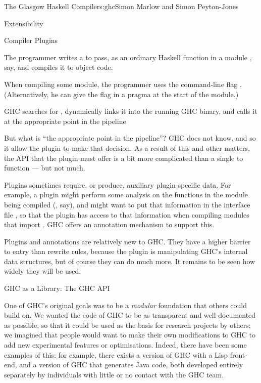 \begin{aosachapter}{The Glasgow Haskell Compiler}{s:ghc}{Simon Marlow and Simon Peyton-Jones}
\begin{aosasect1}{Extensibility}
\begin{aosasect2}{Compiler Plugins}
\begin{aosaitemize}

\item The programmer writes a  to  pass, as an
  ordinary Haskell function in a module , say, and compiles
  it to object code.

\item When compiling some module, the programmer uses the command-line
  flag .  (Alternatively, he can give the flag in a
  pragma at the start of the module.)

\item GHC searches for , dynamically links it into the
  running GHC binary, and calls it at the appropriate point in the
  pipeline

\end{aosaitemize}

But what is ``the appropriate point in the pipeline''?  GHC does not
know, and so it allow the plugin to make that decision.  As a result
of this and other matters, the API that the plugin must offer is a bit
more complicated than a single  to  function ---
but not much.

Plugins sometimes require, or produce, auxiliary plugin-specific data.
For example, a plugin might perform some analysis on the functions in
the module being compiled (, say), and might want to put
that information in the interface file , so that the plugin
has access to that information when compiling modules that import
.  GHC offers an annotation mechanism to support this.

Plugins and annotations are relatively new to GHC.  They have a higher
barrier to entry than rewrite rules, because the plugin is
manipulating GHC's internal data structures, but of course they can do
much more.  It remains to be seen how widely they will be used.

\end{aosasect2}

\begin{aosasect2}{GHC as a Library: The GHC API}
\label{sec.ghc.api}

One of GHC's original goals was to be a \emph{modular} foundation that
others could build on.  We wanted the code of GHC to be as transparent
and well-documented as possible, so that it could be used as the basis
for research projects by others; we imagined that people would want to
make their own modifications to GHC to add new experimental features
or optimisations.  Indeed, there have been some examples of this: for
example, there exists a version of GHC with a Lisp front-end, and a
version of GHC that generates Java code, both developed entirely
separately by individuals with little or no contact with the GHC team.


\end{aosasect2}
\end{aosasect1}
\end{aosachapter}
